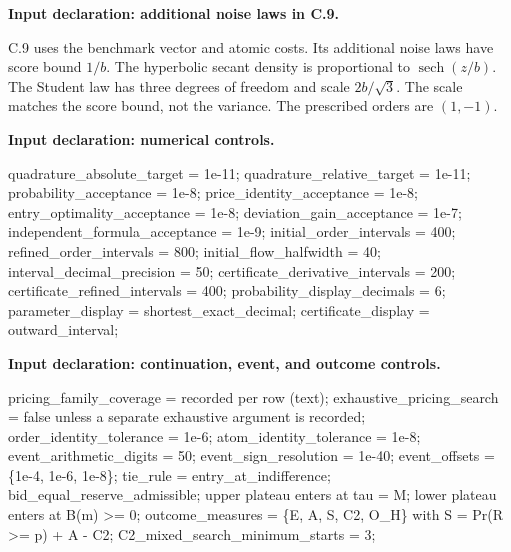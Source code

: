 \documentclass[
  11pt,
]{article}
\newenvironment{Shaded}{}{}
\newcommand{\NormalTok}[1]{#1}
\begin{document}

\textbf{Input declaration: additional noise laws in C.9.}

C.9 uses the benchmark vector and atomic costs. Its additional noise
laws have score bound \(1/b\). The hyperbolic secant density is
proportional to \(\operatorname{sech}(z/b)\). The Student law has
three degrees of freedom and scale \(2b/\sqrt3\). The
scale matches the score bound, not the variance. The prescribed orders
are \((1,-1)\).


\textbf{Input declaration: numerical controls.}

\begin{Shaded}
\begin{Highlighting}[]
\NormalTok{quadrature\_absolute\_target = 1e{-}11;}
\NormalTok{quadrature\_relative\_target = 1e{-}11;}
\NormalTok{probability\_acceptance = 1e{-}8;}
\NormalTok{price\_identity\_acceptance = 1e{-}8;}
\NormalTok{entry\_optimality\_acceptance = 1e{-}8;}
\NormalTok{deviation\_gain\_acceptance = 1e{-}7;}
\NormalTok{independent\_formula\_acceptance = 1e{-}9;}
\NormalTok{initial\_order\_intervals = 400;}
\NormalTok{refined\_order\_intervals = 800;}
\NormalTok{initial\_flow\_halfwidth = 40;}
\NormalTok{interval\_decimal\_precision = 50;}
\NormalTok{certificate\_derivative\_intervals = 200;}
\NormalTok{certificate\_refined\_intervals = 400;}
\NormalTok{probability\_display\_decimals = 6;}
\NormalTok{parameter\_display = shortest\_exact\_decimal;}
\NormalTok{certificate\_display = outward\_interval;}
\end{Highlighting}
\end{Shaded}


\textbf{Input declaration: continuation, event, and outcome controls.}

\begin{Shaded}
\begin{Highlighting}[]
\NormalTok{pricing\_family\_coverage = recorded per row (text);}
\NormalTok{exhaustive\_pricing\_search = false unless a separate exhaustive argument is recorded;}
\NormalTok{order\_identity\_tolerance = 1e{-}6;}
\NormalTok{atom\_identity\_tolerance = 1e{-}8;}
\NormalTok{event\_arithmetic\_digits = 50;}
\NormalTok{event\_sign\_resolution = 1e{-}40;}
\NormalTok{event\_offsets = \{1e{-}4, 1e{-}6, 1e{-}8\};}
\NormalTok{tie\_rule = entry\_at\_indifference; bid\_equal\_reserve\_admissible;}
\NormalTok{           upper plateau enters at tau = M; lower plateau enters at B(m) \textgreater{}= 0;}
\NormalTok{outcome\_measures = \{E, A, S, C2, O\_H\} with S = Pr(R \textgreater{}= p) + A {-} C2;}
\NormalTok{C2\_mixed\_search\_minimum\_starts = 3;}
\end{Highlighting}
\end{Shaded}
\end{document}
